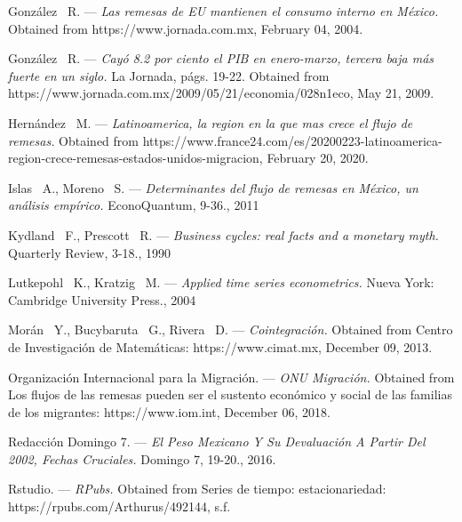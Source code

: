 \documentclass[12pt,english, spanish]{smfart}
\begin{document}
\begin{thebibliography}{99}
  {\sc González \ R.} ---
  {\it Las remesas de EU mantienen el consumo interno en México.}
  Obtained from https://www.jornada.com.mx, February 04, 2004.
  
  {\sc González \ R.} ---
  {\it Cayó 8.2 por ciento el PIB en enero-marzo, tercera baja más fuerte en un siglo.}
  La Jornada, págs. 19-22. Obtained from https://www.jornada.com.mx/2009/05/21/economia/028n1eco, May 21, 2009.
  
  {\sc Hernández \ M.} ---
  {\it Latinoamerica, la region en la que mas crece el flujo de remesas.}
  Obtained from https://www.france24.com/es/20200223-latinoamerica-region-crece-remesas-estados-unidos-migracion, February 20, 2020.
  
  {\sc Islas \ A., Moreno \ S.} ---
  {\it Determinantes del flujo de remesas en México, un análisis empírico.}
  EconoQuantum, 9-36., 2011
  
  {\sc Kydland \ F., Prescott \ R.} ---
  {\it Business cycles: real facts and a monetary myth.}
  Quarterly Review, 3-18., 1990
  
  {\sc Lutkepohl \ K., Kratzig \ M.} ---
  {\it Applied time series econometrics.}
  Nueva York: Cambridge University Press., 2004
  
  {\sc Morán \ Y., Bucybaruta \ G., Rivera \ D.} ---
  {\it Cointegración.}
  Obtained from Centro de Investigación de Matemáticas: https://www.cimat.mx, December 09, 2013.
  
  {\sc Organización Internacional para la Migración.} ---
  {\it ONU Migración.}
  Obtained from Los flujos de las remesas pueden ser el sustento económico y social de las familias de los migrantes: https://www.iom.int, December 06, 2018.
  
  {\sc Redacción Domingo 7.} ---
  {\it El Peso Mexicano Y Su Devaluación A Partir Del 2002, Fechas Cruciales.}
  Domingo 7, 19-20., 2016.
  
  {\sc Rstudio.} ---
  {\it RPubs.}
  Obtained from Series de tiempo: estacionariedad: https://rpubs.com/Arthurus/492144, s.f.
  
\end{thebibliography}
\end{document}
